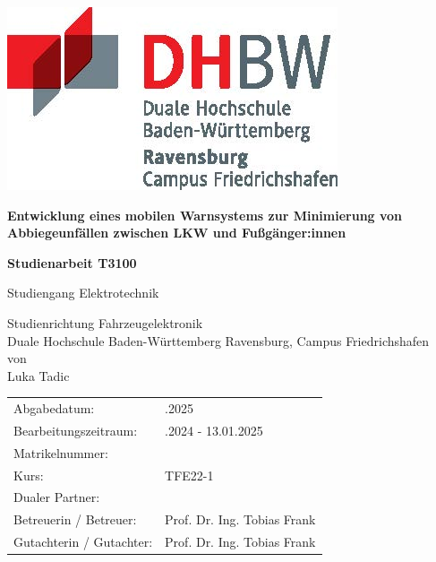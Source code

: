 \documentclass[a4paper, 12pt]{article} %
\newcommand{\titel}{Entwicklung eines mobilen Warnsystems zur Minimierung von Abbiegeunfällen zwischen LKW und Fußgänger:innen}
\newcommand{\arbeit}{Studienarbeit T3100}
\newcommand{\studiengang}{Elektrotechnik}
\newcommand{\studienrichtung}{Fahrzeugelektronik}
\newcommand{\autor}{Luka Tadic}
\newcommand{\abgabe}{13.01.2025}
\newcommand{\bearbeitungszeitraum}{09.10.2024 - 13.01.2025}
\newcommand{\matrikelnr}{5726700}
\newcommand{\kurs}{TFE22-1}
\newcommand{\firma}{}
\newcommand{\betreuerfirma}{Prof. Dr. Ing. Tobias Frank}
\newcommand{\gutachterdhbw}{Prof. Dr. Ing. Tobias Frank}
\begin{document}
\thispagestyle{empty}  %
\hypersetup{pageanchor=false}

\begin{titlepage}
\enlargethispage{4.0cm}
\sffamily  %

\parbox{0.5\linewidth}{
    \begin{flushleft}
    \end{flushleft}
}
\parbox{0.5\linewidth}{
    \begin{flushright}
        \includegraphics[width=0.4\linewidth]{images/DHBW_d_R_FN_46mm_4c}\\[5ex]
    \end{flushright}
}

\begin{center}

{\fontsize{20.74pt}{24pt}\selectfont
\textbf{\titel}\\[1.5ex]}

{\fontsize{17pt}{20pt}\selectfont
\textbf{\arbeit}\\[2ex]}

{\fontsize{14pt}{17pt}\selectfont
Studiengang \studiengang\\[2ex]}

{\fontsize{12pt}{14pt}\selectfont
Studienrichtung \studienrichtung\\[1ex]
Duale Hochschule Baden-Württemberg Ravensburg, Campus Friedrichshafen\\[5ex]
von\\[1ex]
\autor\\[15ex]}

\end{center}

\begin{center}
{\fontsize{12pt}{14pt}\selectfont
\begin{tabular}{ll}
Abgabedatum:                    & \quad \abgabe \\  
Bearbeitungszeitraum:           & \quad \bearbeitungszeitraum \\  
Matrikelnummer:                 & \quad \matrikelnr \\  
Kurs:                           & \quad \kurs \\  
Dualer Partner:                 & \quad \firma \\ %
Betreuerin / Betreuer:          & \quad \betreuerfirma \\  
Gutachterin / Gutachter:        & \quad \gutachterdhbw \\ [2ex]
\end{tabular}
}
\end{center}

\end{titlepage}
\end{document}
